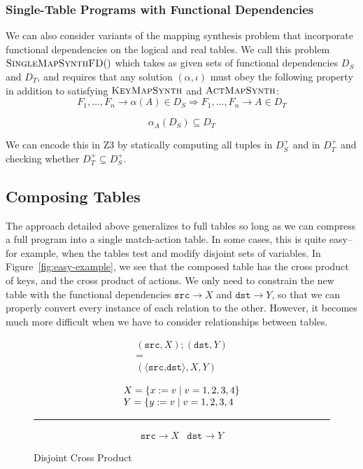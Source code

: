 \subsubsection{Single-Table Programs with Functional Dependencies}

We can also consider variants of the mapping synthesis problem that
incorporate functional dependencies on the logical and real tables. We
call this problem $\textsc{SingleMapSynthFD}()$ which takes as given
sets of functional dependencies $D_S$ and $D_T$, and requires that any
solution $(\alpha, \iota)$ must obey the following property in
addition to satisfying $\textsc{KeyMapSynth}$ and
$\textsc{ActMapSynth}$:
\[F_1,\ldots, F_n  \longrightarrow \alpha(A) \in D_S \Rightarrow
  F_1,\ldots, F_n \longrightarrow A \in D_T\]


\[\alpha_A(D_S) \subseteq D_T\]

We can encode this in Z3 by statically computing all tuples in $D_S^+$
and in $D_T^+$ and checking whether $D_T^+ \subseteq D_S^+$.

\subsection{Composing Tables}

The approach detailed above generalizes to full tables so long as we
can compress a full program into a single match-action table. In some
cases, this is quite easy--for example, when the tables test and
modify disjoint sets of variables. In Figure~\ref{fig:easy-example},
we see that the composed table has the cross product of keys, and the
cross product of actions. We only need to constrain the new table with
the functional dependencies $\texttt{src} \longrightarrow X$ and
$\texttt{dst} \longrightarrow Y$, so that we can properly convert
every instance of each relation to the other. However, it becomes much
more difficult when we have to consider relationships between tables.

\begin{figure}[ptb]
  \begin{minipage}{0.32\columnwidth}
  \[\begin{array}{c}
      (\texttt{src}, X); (\texttt{dst}, Y)
      \\ = \\
      (\langle\texttt{src,dst}\rangle, X, Y)
    \end{array} \]
\end{minipage} \hfill \vline \hfill \begin{minipage}{0.66\columnwidth}
  \[\begin{array}l
      X = \{x:=v \mid v = 1,2,3,4\}\\
      Y = \{y:=v \mid v = 1,2,3,4
    \end{array}\]
  \hrule
  \[\begin{array}{cc}
      \texttt{src} \longrightarrow X
      &\texttt{dst} \longrightarrow Y
    \end{array} \]
\end{minipage}
\caption{Disjoint Cross Product}
  \label{fig:cross-product-ex}
\end{figure}

